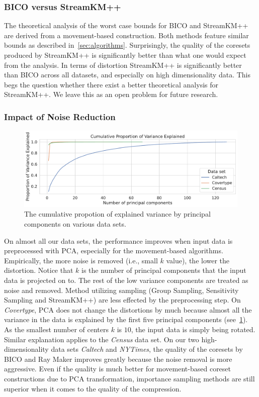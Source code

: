 \subsubsection*{BICO versus StreamKM++}
The theoretical analysis of the worst case bounds for BICO and StreamKM++ are derived from a movement-based construction. Both methods feature similar bounds as described in~\cref{sec:algorithms}. Surprisingly, the quality of the coresets produced by StreamKM++ is significantly better than what one would expect from the analysis. In terms of distortion StreamKM++ is significantly better than BICO across all datasets, and especially on high dimensionality data. This begs the question whether there exist a better theoretical analysis for StreamKM++. We leave this as an open problem for future research.



\subsubsection*{Impact of Noise Reduction}

\begin{figure}
  \caption{The cumulative propotion of explained variance by principal components on various data sets.}
  \label{fig:explained-variance-pca}
  \includegraphics[width=1\linewidth]{figures/explained-variance-plot.pdf}
\end{figure}

On almost all our data sets, the performance improves when input data is preprocessed with PCA, especially for the movement-based algorithms. Empirically, the more noise is removed (i.e., small $k$ value), the lower the distortion. Notice that $k$ is the number of principal components that the input data is projected on to. The rest of the low variance components are treated as noise and removed. Method utilizing sampling (Group Sampling, Sensitivity Sampling and StreamKM++) are less effected by the preprocessing step. On \textit{Covertype}, PCA does not change the distortions by much because almost all the variance in the data is explained by the first five principal components (see~\cref{fig:explained-variance-pca}). As the smallest number of centers $k$ is $10$, the input data is simply being rotated. Similar explanation applies to the \textit{Census} data set. On our two high-dimensionality data sets \textit{Caltech} and \textit{NYTimes}, the quality of the coresets by BICO and Ray Maker improves greatly because the noise removal is more aggressive. Even if the quality is much better for movement-based coreset constructions due to PCA transformation, importance sampling methods are still superior when it comes to the quality of the compression. 

